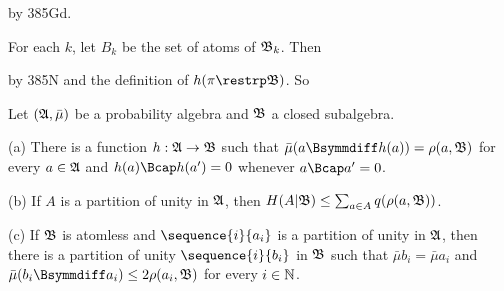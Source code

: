{
     
\noindent by 385Gd.
     
For each $k$, let $B_k$ be the set of atoms of $\frak B_k$.   Then
     
     
\noindent by 385N and the definition of $h(\pi\restrp\frak B)$.   So
     
}%
     
Let $(\frak A,\bar\mu)$ be a probability algebra
and $\frak B$ a closed subalgebra.
     
(a) There is a function $h:\frak A\to\frak B$ such that
$\bar\mu(a\Bsymmdiff h(a))=\rho(a,\frak B)$ for every $a\in\frak A$ and
$h(a)\Bcap h(a')=0$ whenever $a\Bcap a'=0$.
     
(b) If $A$ is a partition of unity in $\frak A$, then
$H(A|\frak B)\le\sum_{a\in A}q(\rho(a,\frak B))$.
     
(c) If $\frak B$ is atomless and $\sequence{i}{a_i}$ is a partition of
unity in $\frak A$,  then there is a partition of unity
$\sequence{i}{b_i}$ in $\frak B$ such that $\bar\mu b_i=\bar\mu a_i$ and
$\bar\mu(b_i\Bsymmdiff a_i)\le 2\rho(a_i,\frak B)$ for every
$i\in\Bbb N$.
     
